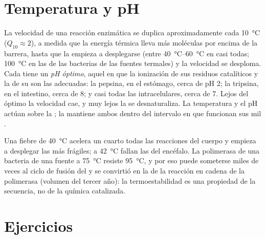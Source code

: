 \section{Temperatura y pH}

\begin{proposition}\label{prop:b1:enzymes:environment}
La velocidad de una reacción enzimática se duplica aproximadamente cada
\qty{10}{\celsius} ($Q_{10} \approx 2$), a medida que la energía térmica
lleva más moléculas por encima de la barrera, hasta que la  empieza a
desplegarse (entre \qtyrange{40}{60}{\celsius} en casi todas;
\qty{100}{\celsius} en las de las bacterias de las fuentes termales) y la
velocidad se desploma. Cada  tiene un \emph{pH óptimo}, aquel en que
la ionización de sus residuos catalíticos y la de su  son las
adecuadas: la pepsina, en el estómago, cerca de pH 2; la tripsina, en el
intestino, cerca de 8; y casi todas las  intracelulares, cerca de 7.
Lejos del óptimo la velocidad cae, y muy lejos la  se
desnaturaliza. La temperatura y el pH actúan sobre la ; la 
mantiene ambos dentro del intervalo en que funcionan sus mil .
\end{proposition}

\begin{example}\label{ex:b1:enzymes:fever}
Una fiebre de \qty{40}{\celsius} acelera un cuarto todas las reacciones del
cuerpo y empieza a desplegar las  más frágiles; a
\qty{42}{\celsius} fallan las del encéfalo. La  polimerasa de una
bacteria de una fuente a \qty{75}{\celsius} resiste \qty{95}{\celsius}, y
por eso puede someterse miles de veces al ciclo de fusión del  y se
convirtió en la  de la reacción en cadena de la polimerasa (volumen
del tercer año): la termoestabilidad es una propiedad de la secuencia, no de
la química catalizada.
\end{example}

\section{Ejercicios}

